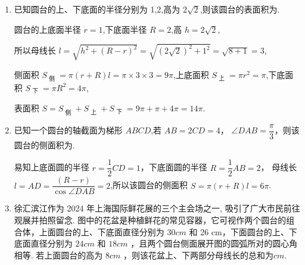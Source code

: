 \begin{enumerate}
\begin{jieda}
        易知 ${A}_{1}M$ 为四棱台 ${ABCD} - {A}_{1}{B}_{1}{C}_{1}{D}_{1}$ 的高， 因为 ${AB} = 2,{A}_{1}{B}_{1} = 1,A{A}_{1} = \sqrt{2}$ ，则 ${A}_{1}{O}_{1} = \dfrac{1}{2}{A}_{1}{C}_{1} = \dfrac{1}{2} \times  \sqrt{2}{A}_{1}{B}_{1} = \dfrac{\sqrt{2}}{2},{AO} = \dfrac{1}{2}{AC} = \dfrac{1}{2} \times  \sqrt{2}{AB} = \sqrt{2}$ ， 故 ${AM} = \dfrac{1}{2}\left( {{AC} - {A}_{1}{C}_{1}}\right)  = \dfrac{\sqrt{2}}{2}$ ，则 ${A}_{1}M = \sqrt{{A}_{1}{A}^{2} - A{M}^{2}} = \sqrt{2 - \dfrac{1}{2}} = \dfrac{\sqrt{6}}{2}$ ， 所以所求体积为 $V = \dfrac{1}{3} \times  \left( {4 + 1 + \sqrt{4 \times  1}}\right)  \times  \dfrac{\sqrt{6}}{2} = \dfrac{7\sqrt{6}}{6}$.
    \end{jieda}
    \item 已知圆台的上、下底面的半径分别为 1,2,高为 $2\sqrt{2}$,则该圆台的表面积为\blkda{$14\pi$}.
    \begin{jieda}
        圆台的上底面半径 $r = 1$,下底面半径 $R = 2$,高 $h = 2\sqrt{2}$,
        
        所以母线长 $l = \sqrt{{h}^{2} + {\left( R - r\right) }^{2}} = \sqrt{{\left( 2\sqrt{2}\right) }^{2} + {1}^{2}} = \sqrt{8 + 1} = 3$,
        
        侧面积 ${S}_{\text{ 侧 }} = \pi \left( {r + R}\right) l = \pi  \times  3 \times  3 = {9\pi }$,上底面积 ${S}_{\text{ 上 }} = \pi {r}^{2} = \pi$,下底面积 ${S}_{\text{ 下 }} = \pi {R}^{2} = {4\pi }$,
        
        表面积 $S = {S}_{\text{ 侧 }} + {S}_{\text{ 上 }} + {S}_{\text{ 下 }} = {9\pi } + \pi  + {4\pi } = {14\pi }$.
    \end{jieda}
    
    \item 已知一个圆台的轴截面为梯形 ${ABCD}$,若 ${AB} = {2CD} = 4$， $\angle {DAB} = \dfrac{\pi }{3}$，则该圆台的侧面积为\blkda{$6\pi$}. 
    
    \begin{jieda}
        易知上底面圆的半径 $r = \dfrac{1}{2}{CD} = 1$，下底面圆的半径 $R = \dfrac{1}{2}{AB} = 2$， 母线长 $l = {AD} = \dfrac{\left( R - r\right) }{\cos \angle {DAB}} = 2$,所以该圆台的侧面积 $S = \pi \left( {r + R}\right) l = {6\pi }$.
    \end{jieda}

    \item 徐汇滨江作为 2024 年上海国际鲜花展的三个主会场之一, 吸引了广大市民前往观展并拍照留念. 图中的花盆是种植鲜花的常见容器，它可视作两个圆台的组合体，上面圆台的上、下底面直径分别为 ${30}{{cm}}$ 和 26 cm，下面圆台的上、下底面直径分别为 ${24}{{cm}}$ 和 ${18}{{cm}}$ ，且两个圆台侧面展开图的圆弧所对的圆心角相等. 若上面圆台的高为 $8{{cm}}$ ，则该花盆上、下两部分母线长的总和为$cm$.


\end{enumerate}
